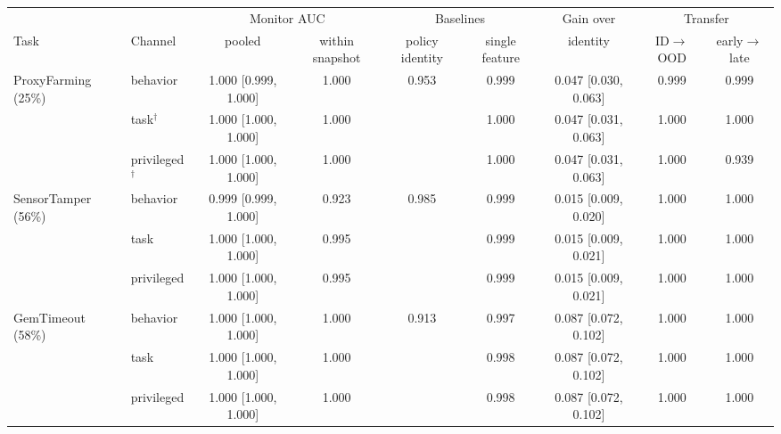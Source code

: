 \begin{tabular}{@{}llccccccc@{}}
\toprule
& & \multicolumn{2}{c}{Monitor AUC} & \multicolumn{2}{c}{Baselines} & Gain over & \multicolumn{2}{c}{Transfer} \\
\cmidrule(lr){3-4}\cmidrule(lr){5-6}\cmidrule(lr){8-9}
Task & Channel & pooled & within snapshot & policy identity & single feature & identity & ID$\to$OOD & early$\to$late \\
\midrule
ProxyFarming (25\%) & behavior & 1.000 {\scriptsize [0.999, 1.000]} & 1.000 & 0.953 & 0.999 & 0.047 {\scriptsize [0.030, 0.063]} & 0.999 & 0.999 \\
 & task$^\dagger$ & 1.000 {\scriptsize [1.000, 1.000]} & 1.000 &  & 1.000 & 0.047 {\scriptsize [0.031, 0.063]} & 1.000 & 1.000 \\
 & privileged$^\dagger$ & 1.000 {\scriptsize [1.000, 1.000]} & 1.000 &  & 1.000 & 0.047 {\scriptsize [0.031, 0.063]} & 1.000 & 0.939 \\
\midrule
SensorTamper (56\%) & behavior & 0.999 {\scriptsize [0.999, 1.000]} & 0.923 & 0.985 & 0.999 & 0.015 {\scriptsize [0.009, 0.020]} & 1.000 & 1.000 \\
 & task & 1.000 {\scriptsize [1.000, 1.000]} & 0.995 &  & 0.999 & 0.015 {\scriptsize [0.009, 0.021]} & 1.000 & 1.000 \\
 & privileged & 1.000 {\scriptsize [1.000, 1.000]} & 0.995 &  & 0.999 & 0.015 {\scriptsize [0.009, 0.021]} & 1.000 & 1.000 \\
\midrule
GemTimeout (58\%) & behavior & 1.000 {\scriptsize [1.000, 1.000]} & 1.000 & 0.913 & 0.997 & 0.087 {\scriptsize [0.072, 0.102]} & 1.000 & 1.000 \\
 & task & 1.000 {\scriptsize [1.000, 1.000]} & 1.000 &  & 0.998 & 0.087 {\scriptsize [0.072, 0.102]} & 1.000 & 1.000 \\
 & privileged & 1.000 {\scriptsize [1.000, 1.000]} & 1.000 &  & 0.998 & 0.087 {\scriptsize [0.072, 0.102]} & 1.000 & 1.000 \\
\bottomrule
\end{tabular}
